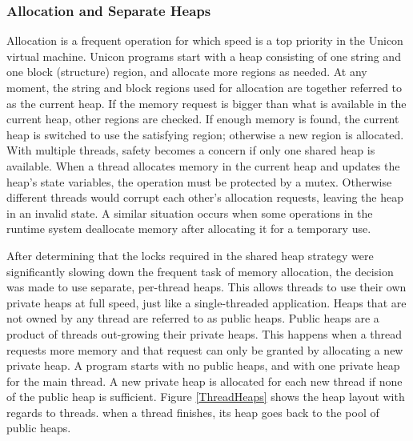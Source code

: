 \subsubsection{Allocation and Separate Heaps}
Allocation is a frequent operation for which speed is a top priority in the
Unicon virtual machine.  Unicon programs start with a heap consisting of
one string and one block (structure) region, and allocate more regions as
needed. At any moment, the string and block regions used for allocation are
together referred to as the current heap. If the memory request is bigger
than what is available in the current heap, other regions are checked. If
enough memory is found, the current heap is switched to use the satisfying
region; otherwise a new region is allocated.  With multiple threads, safety
becomes a concern if only one shared heap is available.  When a thread
allocates memory in the current heap and updates the heap's state
variables, the operation must be protected by a mutex. Otherwise different
threads would corrupt each other's allocation requests, leaving the heap in
an invalid state. A similar situation occurs when some operations in the
runtime system deallocate memory after allocating it for a temporary use.

After determining that the locks required in the shared heap strategy were
significantly slowing down the frequent task of memory allocation, the
decision was made to use separate, per-thread heaps.  This allows threads
to use their own private heaps at full speed, just like a single-threaded
application.  Heaps that are not owned by any thread are referred to as
public heaps. Public heaps are a product of threads out-growing their
private heaps. This happens when a thread requests more memory and that
request can only be granted by allocating a new private heap. A program
starts with no public heaps, and with one private heap for the main
thread. A new private heap is allocated for each new thread if none of the
public heap is sufficient. Figure \ref{ThreadHeaps} shows the heap layout
with regards to threads. when a thread finishes, its heap goes back to the
pool of public heaps.

